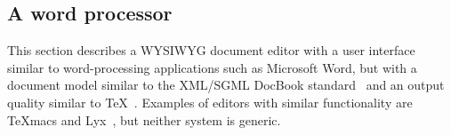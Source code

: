 \documentclass{entcs}
\begin{document}
%																
\subsection{A word processor} \label{sect:wordprocessor} 

This section describes a WYSIWYG document editor with a user interface similar to word-processing applications such as Microsoft Word, but with a document model similar to the XML/SGML DocBook standard~\cite{walsh02docbook} and an output quality similar to \TeX~\cite{knuth84tex}. Examples of editors with similar functionality are TeXmacs\cite{texmacs} and Lyx~\cite{lyx}, but neither system is generic.
\vspace*{1.4ex}


\newcommand{\screenshotWin}[2]{%
%
\noindent 
\begin{center}
\begin{picture}(225,165)(0,0)
\begin{scriptsize}
\put(-2,30){ \epsfig{file=pics/eps/WordprocessorWindow.eps, height=4.8cm}}
\put(0,132){ 
\begin{tabular}[t]{p{7cm}}
\hfill{\normalsize Proxima}\hfill~\\
\vspace{0.001cm}
\hfill{\scriptsize Martijn M. Schrage}\hfill~\\
\vspace{0.0005cm}
{\small Contents}\\
\vspace{0.0007cm}
~~~1~~Editing~structured~documents\\
~~~2~~Use cases \\
~~~3~~Functional requirements\\
\vspace{0.2cm}
{\small 1~~Editing~structured~documents}\\
\vspace{0.001cm}
\parbox{6.9cm}{While the term {\em editor} is usually only associated with plain-text editors such as Emacs~\cite{stallman81emacs} or\vline~ the ubiquitous Microsoft Notepad, we will ~~~~~~~~~~~~~~~~~\strut
}\\
\end{tabular}
}
\end{scriptsize}
\put(0,0) { \makebox(190,30){#2}}
\end{picture}
\end{center}
}
\end{document}
